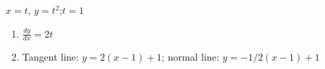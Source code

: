 {$x=t$, $y=t^2$;\quad $t=1$\label{ex:09_03_ex_05}}
{\begin{enumerate}
	\item $\frac{dy}{dx} = 2t$
	\item	Tangent line: $y= 2(x-1)+1$; normal line: $y = -1/2(x-1)+1$
\end{enumerate}
}
